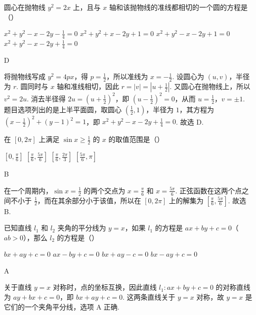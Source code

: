 \documentclass[UTF8,a4paper,oneside,11pt]{ctexbook}
\begin{document}
\begin{problem}
圆心在抛物线 \(y^{2} = 2x \) 上，且与 \(x \) 轴和该抛物线的准线都相切的一个圆的方程是（\quad）

\choices
    {\(x^{2} + y^{2} - x - 2y - \frac{1}{4} = 0\)}
    {\(x^{2} + y^{2} + x - 2y + 1 = 0\)}
    {\(x^{2} + y^{2} - x - 2y + 1 = 0\)}
    {\(x^{2} + y^{2} - x - 2y + \frac{1}{4} = 0\)}

\begin{answer}
D
\end{answer}

\begin{solution}
将抛物线写成 \(y^2=4px\)，得 \(p=\frac{1}{2}\)，所以准线为 \(x=-\frac{1}{2}\). 设圆心为 \((u,v)\)，半径为 \(r\). 圆同时与 \(x\) 轴和准线相切，因此 \(r=|v|=\left|u+\frac{1}{2}\right|\). 又圆心在抛物线上，所以 \(v^2=2u\). 消去半径得
\(2u=\left(u+\frac{1}{2}\right)^2\)，即 \(\left(u-\frac{1}{2}\right)^2=0\)，从而 \(u=\frac{1}{2}\)，\(v=\pm1\). 题目选项列出的是上半平面圆，取圆心 \(\left(\frac{1}{2},1\right)\)，半径为 \(1\)，其方程为 \(\left(x-\frac{1}{2}\right)^2+(y-1)^2=1\)，即 \(x^2+y^2-x-2y+\frac{1}{4}=0\). 故选 D.
\end{solution}
\end{problem}

\begin{problem}
在 \([0,2\pi]\) 上满足 \(\sin x \geqslant \frac{1}{2}\) 的 \(x\) 的取值范围是（\quad）

\choices
    {\(\left[0, \frac{\pi}{6}\right]\)}
    {\(\left[\frac{\pi}{6}, \frac{5\pi}{6}\right]\)}
    {\(\left[\frac{\pi}{6}, \frac{2\pi}{3}\right]\)}
    {\(\left[\frac{5\pi}{6}, \pi\right]\)}

\begin{answer}
B
\end{answer}

\begin{solution}
在一个周期内，\(\sin x=\frac{1}{2}\) 的两个交点为 \(x=\frac{\pi}{6}\) 和 \(x=\frac{5\pi}{6}\). 正弦函数在这两个点之间不小于 \(\frac{1}{2}\)，而在其余部分小于该值，所以在 \([0,2\pi]\) 上的解集为 \(\left[\frac{\pi}{6},\frac{5\pi}{6}\right]\). 故选 B.
\end{solution}
\end{problem}

\begin{problem}
已知直线 \(l_{1}\) 和 \(l_{2}\) 夹角的平分线为 \(y = x\)，如果 \(l_{1}\) 的方程是 \(ax + by + c = 0\)（\(ab > 0\)），那么 \(l_{2}\) 的方程是（\quad）

\choices
    {\(bx + ay + c = 0\)}
    {\(ax - by + c = 0\)}
    {\(bx + ay - c = 0\)}
    {\(bx - ay + c = 0\)}

\begin{answer}
A
\end{answer}

\begin{solution}
关于直线 \(y=x\) 对称时，点的坐标互换，因此直线 \(l_1\colon ax+by+c=0\) 的对称直线为 \(ay+bx+c=0\)，即 \(bx+ay+c=0\). 这两条直线关于 \(y=x\) 对称，故 \(y=x\) 是它们的一个夹角平分线，选项 A 正确.
\end{solution}
\end{problem}
\end{document}
